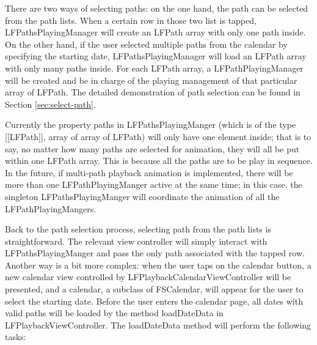 \documentclass[12pt,a4paper]{article}
\renewcommand\texttt[1]{{\ttfamily\color{textttColor}#1}}
\begin{document}
                There are two ways of selecting paths: on the one hand, the path can be selected from the path lists. When a certain row in those two list is tapped, \texttt{LFPathsPlayingManager} will create an \texttt{LFPath} array with only one path inside. On the other hand, if the user selected multiple paths from the calendar by specifying the starting date, \texttt{LFPathsPlayingManager} will load an \texttt{LFPath} array with only many paths inside. For each \texttt{LFPath} array, a \texttt{LFPathPlayingManager} will be created and be in charge of the playing management of that particular array of \texttt{LFPath}. The detailed demonstration of path selection can be found in Section \ref{sec:select-path}.
                
                Currently the property \texttt{paths} in \texttt{LFPathsPlayingManger} (which is of the type \texttt{[[LFPath]]}, array of array of \texttt{LFPath}) will only have one element inside; that is to say, no matter how many paths are selected for animation, they will all be put within one \texttt{LFPath} array. This is because all the paths are to be play in sequence. In the future, if multi-path playback animation is implemented, there will be more than one \texttt{LFPathPlayingManger} active at the same time; in this case, the singleton \texttt{LFPathsPlayingManger} will coordinate the animation of all the \texttt{LFPathPlayingManger}s.
                
                Back to the path selection process, selecting path from the path lists is straightforward. The relevant view controller will simply interact with \texttt{LFPathsPlayingManger} and pass the only path associated with the tapped row. Another way is a bit more complex: when the user taps on the calendar button, a new calendar view controlled by \texttt{LFPlaybackCalendarViewController} will be presented, and a calendar, a subclass of \texttt{FSCalendar}, will appear for the user to select the starting date. Before the user enters the calendar page, all dates with valid paths will be loaded by the method \texttt{loadDateData} in \texttt{LFPlaybackViewController}. The \texttt{loadDateData} method will perform the following tasks:
                
\end{document}

